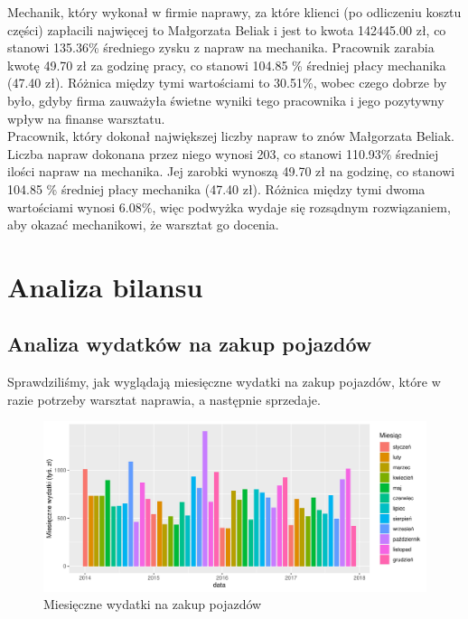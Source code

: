 \documentclass{article}\usepackage[]{graphicx}\usepackage[]{xcolor}
\makeatletter
\def\maxwidth{ %
  \ifdim\Gin@nat@width>\linewidth
    \linewidth
  \else
    \Gin@nat@width
  \fi
}
\newenvironment{knitrout}{}{} %
\makeatother
\begin{document}
Mechanik, który wykonał w firmie naprawy, za które klienci (po odliczeniu kosztu części) zapłacili najwięcej to Małgorzata Beliak i jest to kwota 142445.00 zł, co stanowi 135.36\% średniego zysku z napraw na mechanika. Pracownik zarabia kwotę 49.70 zł za godzinę pracy, co stanowi 104.85 \% średniej płacy mechanika (47.40 zł). Różnica między tymi wartościami to 30.51\%, wobec czego dobrze by było, gdyby firma zauważyła świetne wyniki tego pracownika i jego pozytywny wpływ na finanse warsztatu. \\

Pracownik, który dokonał największej liczby napraw to znów Małgorzata Beliak. Liczba napraw dokonana przez niego wynosi 203, co stanowi 110.93\% średniej ilości napraw na mechanika. Jej zarobki wynoszą 49.70 zł na godzinę, co stanowi 104.85 \% średniej płacy mechanika (47.40 zł). Różnica między tymi dwoma wartościami wynosi 6.08\%, więc podwyżka wydaje się rozsądnym rozwiązaniem, aby okazać mechanikowi, że warsztat go docenia.

\section{Analiza bilansu}

\subsection{Analiza wydatków na zakup pojazdów}

Sprawdziliśmy, jak wyglądają miesięczne wydatki na zakup pojazdów, które w razie potrzeby warsztat naprawia, a następnie sprzedaje.

\begin{knitrout}
\color{fgcolor}\begin{figure}[H]

{\centering \includegraphics[width=\maxwidth]{figure/fig_zakup_pojazdu-1} 

}

\caption[Miesięczne wydatki na zakup pojazdów]{Miesięczne wydatki na zakup pojazdów}\label{fig:fig_zakup_pojazdu}
\end{figure}

\end{knitrout}
\end{document}
